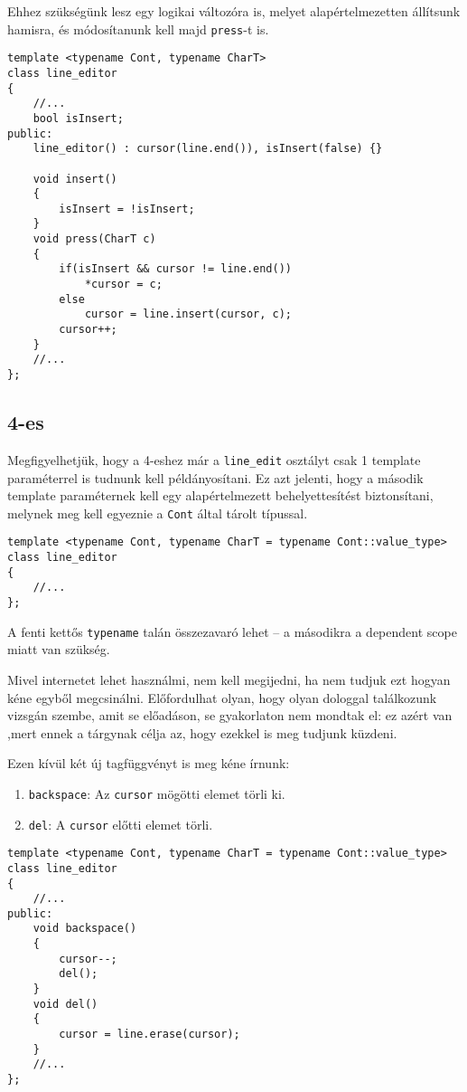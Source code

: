 \documentclass[a4paper,11.5pt,table]{article}
\begin{document}
	Ehhez szükségünk lesz egy logikai változóra is, melyet alapértelmezetten állítsunk hamisra, és módosítanunk kell majd \texttt{press}-t is.
\begin{lstlisting}
template <typename Cont, typename CharT>
class line_editor
{
	//...
	bool isInsert;
public:
	line_editor() : cursor(line.end()), isInsert(false) {}
	
	void insert()
	{
		isInsert = !isInsert;
	}
	void press(CharT c)
	{
		if(isInsert && cursor != line.end())
			*cursor = c;
		else
			cursor = line.insert(cursor, c);
		cursor++;
	}
	//...
};
\end{lstlisting}
	\subsection{4-es}
	Megfigyelhetjük, hogy a 4-eshez már a \texttt{line\_edit} osztályt csak 1 template paraméterrel is tudnunk kell példányosítani. Ez azt jelenti, hogy a második template paraméternek kell egy alapértelmezett behelyettesítést biztonsítani, melynek meg kell egyeznie a \texttt{Cont} által tárolt típussal.
\begin{lstlisting}
template <typename Cont, typename CharT = typename Cont::value_type>
class line_editor
{
	//...
};
\end{lstlisting}
	\begin{note}
		A fenti kettős \texttt{typename} talán összezavaró lehet -- a másodikra a dependent scope miatt van szükség.
	\end{note}
	\begin{note}
		Mivel internetet lehet használmi, nem kell megijedni, ha nem tudjuk ezt hogyan kéne egyből megcsinálni. Előfordulhat olyan, hogy olyan dologgal találkozunk vizsgán szembe, amit se előadáson, se gyakorlaton nem mondtak el: ez azért van ,mert ennek a tárgynak célja az, hogy ezekkel is meg tudjunk küzdeni.
	\end{note}
	 
	Ezen kívül két új tagfüggvényt is meg kéne írnunk:
	\begin{enumerate}
		\item \texttt{backspace}: Az \texttt{cursor} mögötti elemet törli ki.
		\item \texttt{del}: A \texttt{cursor} előtti elemet törli.
	\end{enumerate}
\begin{lstlisting}
template <typename Cont, typename CharT = typename Cont::value_type>
class line_editor
{
	//...
public:	
	void backspace()
	{
		cursor--;
		del();
	}
	void del()
	{
		cursor = line.erase(cursor);
	}
	//...
};
\end{lstlisting}
\end{document}
